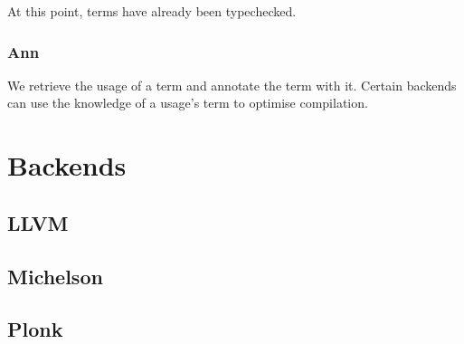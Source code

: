 \documentclass[acmsmall]{acmart}
\numberwithin{figure}{subsection}
\begin{document}
At this point, terms have already been typechecked.

\subsubsection{Ann}

We retrieve the usage of a term and annotate the term with it. Certain backends can use the knowledge of a usage's term to optimise compilation.

\section{Backends}
\subsection{LLVM}
\subsection{Michelson}
\subsection{Plonk}
\end{document}
